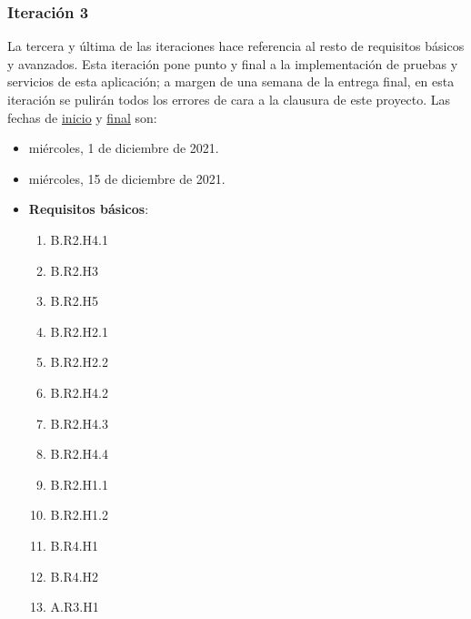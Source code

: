 \documentclass[../ei103948-project-documentation.tex]{subfiles}
\begin{document}
        \subsubsection{Iteración 3}
        La tercera y última de las iteraciones hace referencia al resto de requisitos básicos y avanzados. Esta iteración pone punto y final a la implementación de pruebas y servicios de esta aplicación; a margen de una semana de la entrega final, en esta iteración se pulirán todos los errores de cara a la clausura de este proyecto. Las fechas de \underline{inicio} y \underline{final} son:
            \begin{itemize}
                \item [\faIcon{calendar-alt}] miércoles, 1 de diciembre de 2021.
                \item [\faIcon{calendar-check}] miércoles, 15 de diciembre de 2021.
            \end{itemize}
            \begin{itemize}
                \item \textbf{Requisitos básicos}:
                \begin{enumerate}
                    \item B.R2.H4.1
                    \item B.R2.H3
                    \item B.R2.H5
                    \item B.R2.H2.1
                    \item B.R2.H2.2
                    \item B.R2.H4.2
                    \item B.R2.H4.3
                    \item B.R2.H4.4
                    \item B.R2.H1.1
                    \item B.R2.H1.2
                    \item B.R4.H1
                    \item B.R4.H2
                    \item A.R3.H1
                \end{enumerate}
            \end{itemize}
\end{document}

